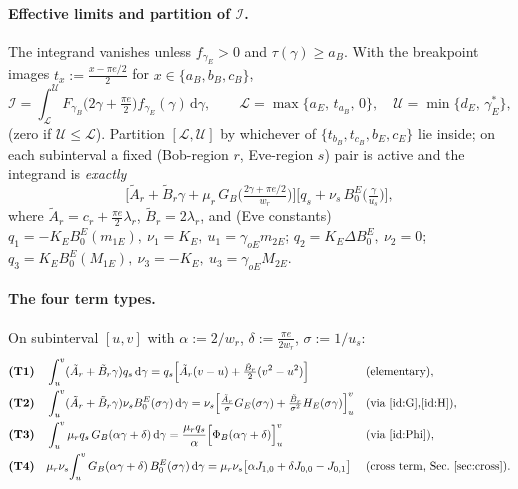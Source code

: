 \documentclass[11pt]{article}
\newcommand{\dd}{\,\mathrm{d}}
\begin{document}
\paragraph{Effective limits and partition of $\mathcal I$.} The integrand vanishes unless $f_{\gamma_E}>0$ and $\tau(\gamma)\ge a_B$. With the breakpoint images $t_x:=\tfrac{x-\pi e/2}{2}$ for $x\in\{a_B,b_B,c_B\}$,
\begin{equation}
\mathcal I=\int_{\mathcal L}^{\mathcal U}F_{\gamma_B}\big(2\gamma+\tfrac{\pi e}{2}\big)f_{\gamma_E}(\gamma)\dd\gamma,
\qquad
\mathcal L=\max\{a_E,\,t_{a_B},\,0\},\quad
\mathcal U=\min\{d_E,\,\gamma_E^{*}\},
\end{equation}
(zero if $\mathcal U\le\mathcal L$). Partition $[\mathcal L,\mathcal U]$ by whichever of $\{t_{b_B},t_{c_B},b_E,c_E\}$ lie inside; on each subinterval a fixed (Bob-region $r$, Eve-region $s$) pair is active and the integrand is \emph{exactly}
\begin{equation}
\Big[\tilde A_r+\tilde B_r\gamma+\mu_r\,G_B\!\Big(\tfrac{2\gamma+\pi e/2}{w_r}\Big)\Big]
\Big[q_s+\nu_s\,B_0^{E}\!\big(\tfrac{\gamma}{u_s}\big)\Big],
\end{equation}
where $\tilde A_r=c_r+\tfrac{\pi e}{2}\lambda_r$, $\tilde B_r=2\lambda_r$, and (Eve constants)
$q_1=-K_E B_0^{E}(m_{1E}),\ \nu_1=K_E,\ u_1=\gamma_{oE}m_{2E}$;\quad
$q_2=K_E\Delta B_0^{E},\ \nu_2=0$;\quad
$q_3=K_E B_0^{E}(M_{1E}),\ \nu_3=-K_E,\ u_3=\gamma_{oE}M_{2E}$.

\paragraph{The four term types.} On subinterval $[u,v]$ with $\alpha:=2/w_r$, $\delta:=\tfrac{\pi e}{2w_r}$, $\sigma:=1/u_s$:
\begin{align}
\textbf{(T1)}\quad &\int_u^v(\tilde A_r+\tilde B_r\gamma)q_s\dd\gamma
=q_s\Big[\tilde A_r(v-u)+\tfrac{\tilde B_r}{2}(v^2-u^2)\Big] &&\text{(elementary)},\\
\textbf{(T2)}\quad &\int_u^v(\tilde A_r+\tilde B_r\gamma)\nu_s B_0^{E}(\sigma\gamma)\dd\gamma
=\nu_s\Big[\tfrac{\tilde A_r}{\sigma}G_E(\sigma\gamma)+\tfrac{\tilde B_r}{\sigma^2}H_E(\sigma\gamma)\Big]_u^v &&\text{(via \eqref{id:G},\eqref{id:H})},\\
\textbf{(T3)}\quad &\int_u^v \mu_r q_s\,G_B(\alpha\gamma+\delta)\dd\gamma
=\frac{\mu_r q_s}{\alpha}\Big[\Phi_B(\alpha\gamma+\delta)\Big]_u^v &&\text{(via \eqref{id:Phi})},\\
\textbf{(T4)}\quad &\mu_r\nu_s\!\int_u^v G_B(\alpha\gamma+\delta)\,B_0^{E}(\sigma\gamma)\dd\gamma
=\mu_r\nu_s\big[\alpha J_{1,0}+\delta J_{0,0}-J_{0,1}\big] &&\text{(cross term, Sec.~\ref{sec:cross})}.
\end{align}
\end{document}

